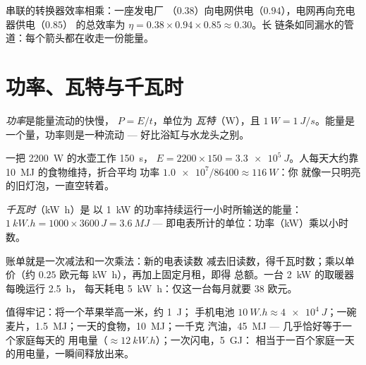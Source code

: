\begin{remark}[效率相乘]\label{rem:g10:energy-conservation:chain-eta}
串联的转换器效率相乘：一座发电厂
（$0.38$）向电网供电（$0.94$），电网再向充电器供电（$0.85$）
的总效率为 $\eta = 0.38 \times 0.94 \times 0.85 \approx 0.30$。长
链条如同漏水的管道：每个箭头都在收走一份能量。
\end{remark}

\section{功率、瓦特与千瓦时}

\begin{definition}[功率]\label{def:g10:energy-conservation:power}
\emph{功率}是能量流动的快慢，
$P = E/t$，单位为 \emph{瓦特}（\unit{W}），且
$\qty{1}{W} = \qty{1}{J/s}$。能量是一个量，功率则是一种流动 ---
好比浴缸与水龙头之别。
\end{definition}

\begin{example}[水壶与人]\label{ex:g10:energy-conservation:power}
一把 \qty{2200}{W} 的水壶工作 \qty{150}{s}，
$E = 2200 \times 150 = \qty{3.3e5}{J}$。人每天大约靠
\qty{10}{MJ} 的食物维持，折合平均
功率 $\num{1.0e7}/\num{86400} \approx \qty{116}{W}$：你
就像一只明亮的旧灯泡，一直空转着。
\end{example}

\begin{definition}[千瓦时]\label{def:g10:energy-conservation:kwh}
\emph{千瓦时}（\unit{kW.h}）是
以 \qty{1}{kW} 的功率持续运行一小时所输送的能量：
$\qty{1}{kW.h} = 1000 \times 3600\,\unit{J} = \qty{3.6}{MJ}$ ---
即电表所计的单位：功率（\unit{kW}）乘以小时数。
\end{definition}

\begin{example}[读懂电费账单]\label{ex:g10:energy-conservation:bill}
账单就是一次减法和一次乘法：新的电表读数
减去旧读数，得千瓦时数；乘以单价（约
$0.25$ 欧元每 \unit{kW.h}），再加上固定月租，即得
总额。一台 \qty{2}{kW} 的取暖器每晚运行 \qty{2.5}{h}，
每天耗电 \qty{5}{kW.h}：仅这一台每月就要 $38$ 欧元。
\end{example}

\begin{example}[数量级]\label{ex:g10:energy-conservation:orders}
值得牢记：将一个苹果举高一米，约 \qty{1}{J}；
手机电池 $\qty{10}{W.h} \approx \qty{4e4}{J}$；一碗
麦片，\qty{1.5}{MJ}；一天的食物，\qty{10}{MJ}；一千克
汽油，\qty{45}{MJ} --- 几乎恰好等于一个家庭每天的
用电量（$\approx \qty{12}{kW.h}$）；一次闪电，\qty{5}{GJ}：
相当于一百个家庭一天的用电量，一瞬间释放出来。
\end{example}

